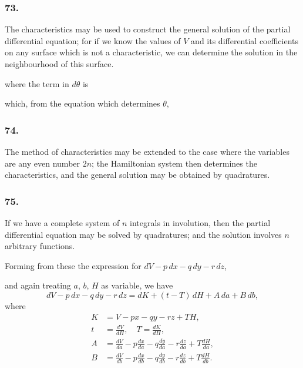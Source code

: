 \documentclass[11pt,a4paper]{book}
\begin{document}
\subsubsection*{73.}

The characteristics may be used to construct the general solution of the partial differential equation; for if we know the values of $V$ and its differential coefficients on any surface which is not a characteristic, we can determine the solution in the neighbourhood of this surface.

\newpage
\setcounter{page}{147}

where the term in $d\theta$ is

which, from the equation which determines $\theta$,

\subsubsection*{74.}

The method of characteristics may be extended to the case where the variables are any even number $2n$; the Hamiltonian system then determines the characteristics, and the general solution may be obtained by quadratures.

\subsubsection*{75.}

If we have a complete system of $n$ integrals in involution, then the partial differential equation may be solved by quadratures; and the solution involves $n$ arbitrary functions.

\newpage
\setcounter{page}{148}

Forming from these the expression for $dV - p\,dx - q\,dy - r\,dz$,

and again treating $a$, $b$, $H$ as variable, we have
\[
dV - p\,dx - q\,dy - r\,dz = dK + (t - T)\,dH + A\,da + B\,db,
\]
where
\begin{align*}
K &= V - px - qy - rz + T H, \\
t &= \frac{dV}{dH}, \quad T = \frac{dK}{dH}, \\
A &= \frac{dV}{da} - p\frac{dx}{da} - q\frac{dy}{da} - r\frac{dz}{da} + T\frac{dH}{da}, \\
B &= \frac{dV}{db} - p\frac{dx}{db} - q\frac{dy}{db} - r\frac{dz}{db} + T\frac{dH}{db}.
\end{align*}

\newpage
\setcounter{page}{149}
\end{document}
